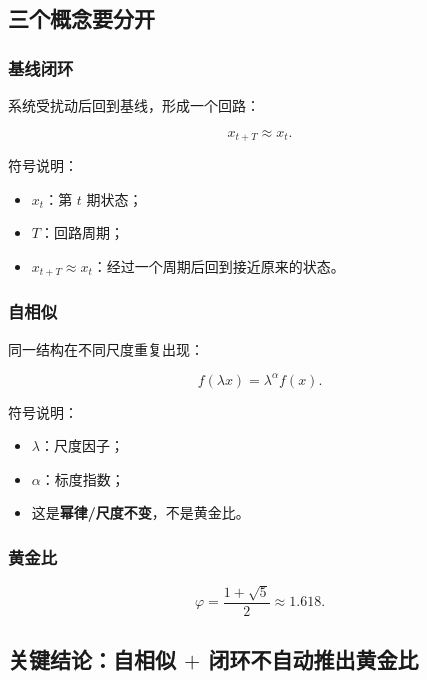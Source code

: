 \documentclass[UTF8,a4paper,11pt]{ctexart}
\begin{document}
\subsection{三个概念要分开}

\subsubsection{基线闭环}

系统受扰动后回到基线，形成一个回路：

\begin{equation}
x_{t+T}\approx x_t.
\end{equation}

符号说明：

\begin{itemize}[leftmargin=2em]
\item $x_t$：第 $t$ 期状态；
\item $T$：回路周期；
\item $x_{t+T}\approx x_t$：经过一个周期后回到接近原来的状态。
\end{itemize}

\subsubsection{自相似}

同一结构在不同尺度重复出现：

\begin{equation}
f(\lambda x)=\lambda^\alpha f(x).
\end{equation}

符号说明：

\begin{itemize}[leftmargin=2em]
\item $\lambda$：尺度因子；
\item $\alpha$：标度指数；
\item 这是\textbf{幂律/尺度不变}，不是黄金比。
\end{itemize}

\subsubsection{黄金比}

\begin{equation}
\varphi=\frac{1+\sqrt5}{2}\approx1.618.
\end{equation}

\subsection{关键结论：自相似 $+$ 闭环不自动推出黄金比}
\end{document}
